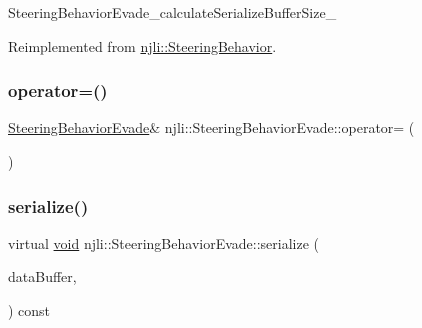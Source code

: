 \begin{DoxyCodeInclude}
\end{DoxyCodeInclude}
Steering\+Behavior\+Evade\+\_\+calculate\+Serialize\+Buffer\+Size\+\_\+ 

Reimplemented from \mbox{\hyperlink{classnjli_1_1_steering_behavior_acd7af46e42a8a3fc1208a47f50836ac8}{njli\+::\+Steering\+Behavior}}.

\mbox{\label{classnjli_1_1_steering_behavior_evade_ab21b49cd6e2615dd5052a766b3b2cbbf}} 
\subsubsection{\texorpdfstring{operator=()}{operator=()}}
{\footnotesize\ttfamily \mbox{\hyperlink{classnjli_1_1_steering_behavior_evade}{Steering\+Behavior\+Evade}}\& njli\+::\+Steering\+Behavior\+Evade\+::operator= (\begin{DoxyParamCaption}\item[{const \mbox{\hyperlink{classnjli_1_1_steering_behavior_evade}{Steering\+Behavior\+Evade}} \&}]{ }\end{DoxyParamCaption})\hspace{0.3cm}{\ttfamily [protected]}}

\mbox{\label{classnjli_1_1_steering_behavior_evade_a8a2e13abe004302c0ef004cc034a2f6d}} 
\subsubsection{\texorpdfstring{serialize()}{serialize()}}
{\footnotesize\ttfamily virtual \mbox{\hyperlink{_thread_8h_af1e856da2e658414cb2456cb6f7ebc66}{void}} njli\+::\+Steering\+Behavior\+Evade\+::serialize (\begin{DoxyParamCaption}\item[{\mbox{\hyperlink{_thread_8h_af1e856da2e658414cb2456cb6f7ebc66}{void}} $\ast$}]{data\+Buffer,  }\item[{bt\+Serializer $\ast$}]{ }\end{DoxyParamCaption}) const\hspace{0.3cm}{\ttfamily [virtual]}}



